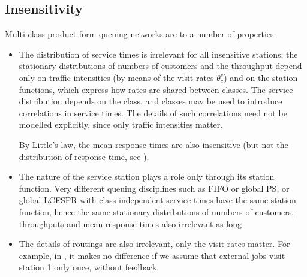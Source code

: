 \subsection{Insensitivity} Multi-class product
form queuing networks are  to a
number of properties:
\begin{itemize}
    \item The distribution of service times is irrelevant
        for all insensitive stations; the stationary
        distributions of numbers of customers and the
        throughput depend only on traffic intensities (by
        means of the visit rates $\theta^s_c$) and on the
        station functions, which express how rates are
        shared between classes. The service distribution
        depends on the class, and classes may be used to
        introduce correlations in service times. The
        details of such correlations need not be modelled
        explicitly, since only traffic intensities matter.


        By Little's law, the mean response times are also
        insensitive (but not the distribution of response
        time, see ).
    \item The nature of the service station plays a
    role only through its station function. Very
    different queuing disciplines such as FIFO or
    global PS, or global LCFSPR with class
    independent service times have the same
    station function, hence the same stationary
    distributions of numbers of customers,
    throughputs and mean response times
    also irrelevant as long
    \item The details of routings are also irrelevant, only
        the visit rates matter. For example, in
        , it makes no difference if we
        assume that external jobs visit station 1 only
        once, without feedback.
\end{itemize}
\begin{figure}
 \label{fig-q-qnet-bonald}
\end{figure}
